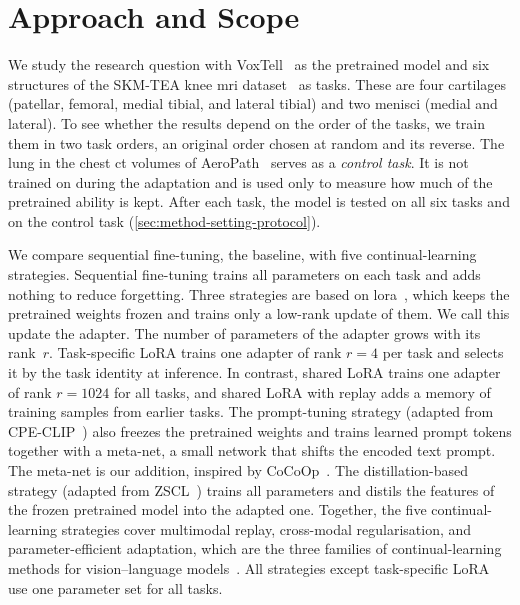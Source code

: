 \section{Approach and Scope}
\label{sec:intro-approach}

We study the research question with VoxTell~\cite{rokuss2025voxtellfreetextpromptableuniversal} as the pretrained model and six structures of the SKM-TEA knee \gls{mri} dataset~\cite{desai2021skmtea} as tasks.
These are four cartilages (patellar, femoral, medial tibial, and lateral tibial) and two menisci (medial and lateral).
To see whether the results depend on the order of the tasks, we train them in two task orders, an original order chosen at random and its reverse.
The lung in the chest \gls{ct} volumes of AeroPath~\cite{støverud2023aeropathairwaysegmentationbenchmark} serves as a \emph{control task}.
It is not trained on during the adaptation and is used only to measure how much of the pretrained ability is kept.
After each task, the model is tested on all six tasks and on the control task (\cref{sec:method-setting-protocol}).

We compare sequential fine-tuning, the baseline, with five continual-learning strategies.
Sequential fine-tuning trains all parameters on each task and adds nothing to reduce forgetting.
Three strategies are based on \gls{lora}~\cite{hu2022lora}, which keeps the pretrained weights frozen and trains only a low-rank update of them.
We call this update the adapter.
The number of parameters of the adapter grows with its rank~$r$.
Task-specific LoRA trains one adapter of rank $r = 4$ per task and selects it by the task identity at inference.
In contrast, shared LoRA trains one adapter of rank $r = 1024$ for all tasks, and shared LoRA with replay adds a memory of training samples from earlier tasks.
The prompt-tuning strategy (adapted from CPE-CLIP~\cite{D_Alessandro_2023}) also freezes the pretrained weights and trains learned prompt tokens together with a meta-net, a small network that shifts the encoded text prompt.
The meta-net is our addition, inspired by CoCoOp~\cite{zhou2022cocoop}.
The distillation-based strategy (adapted from ZSCL~\cite{zheng2023preventingzeroshottransferdegradation}) trains all parameters and distils the features of the frozen pretrained model into the adapted one.
Together, the five continual-learning strategies cover multimodal replay, cross-modal regularisation, and parameter-efficient adaptation, which are the three families of continual-learning methods for vision--language models~\cite[Sec.~4]{liu2026continuallearningvlmssurvey}.
All strategies except task-specific LoRA use one parameter set for all tasks.

